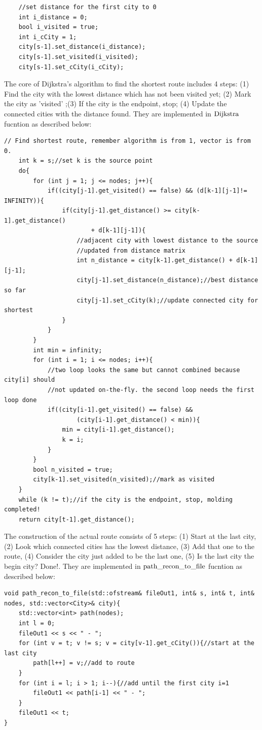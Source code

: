 \documentclass[a4paper,12pt]{article}%
\begin{document}
\begin{lstlisting}
    //set distance for the first city to 0
    int i_distance = 0;
    bool i_visited = true;
    int i_cCity = 1;
    city[s-1].set_distance(i_distance);
    city[s-1].set_visited(i_visited);
    city[s-1].set_cCity(i_cCity);
\end{lstlisting}
The core of Dijkstra's algorithm to find the shortest route includes 4 steps: (1) Find the city with the lowest distance which has not been visited yet; (2) Mark the city as 'visited' ;(3) If the city is the endpoint, stop; (4) Update the connected cities with the distance found. They are implemented in  $\lstinline{Dijkstra}$ fucntion as described below:\newpage
\begin{lstlisting}[title = $\lstinline{Dijkstra}$]
// Find shortest route, remember algorithm is from 1, vector is from 0.
    int k = s;//set k is the source point
    do{
        for (int j = 1; j <= nodes; j++){
            if((city[j-1].get_visited() == false) && (d[k-1][j-1]!= INFINITY)){
                if(city[j-1].get_distance() >= city[k-1].get_distance() 
                        + d[k-1][j-1]){
                    //adjacent city with lowest distance to the source
                    //updated from distance matrix
                    int n_distance = city[k-1].get_distance() + d[k-1][j-1];
                    city[j-1].set_distance(n_distance);//best distance so far
                    city[j-1].set_cCity(k);//update connected city for shortest
                }        
            }           
        }
        int min = infinity;
        for (int i = 1; i <= nodes; i++){           
            //two loop looks the same but cannot combined because city[i] should
            //not updated on-the-fly. the second loop needs the first loop done
            if((city[i-1].get_visited() == false) && 
                    (city[i-1].get_distance() < min)){
                min = city[i-1].get_distance();
                k = i;
            }
        }
        bool n_visited = true;
        city[k-1].set_visited(n_visited);//mark as visited
    }
    while (k != t);//if the city is the endpoint, stop, molding completed! 
    return city[t-1].get_distance();    
\end{lstlisting}
The construction of the actual route consists of 5 steps: (1) Start at the last city, (2) Look which connected cities has the lowest distance, (3) Add that one to the route, (4) Consider the city just added to be the last one, (5) Is the last city the begin city? Done!. They are implemented in  $\lstinline{path_recon_to_file}$ fucntion as described below:
\begin{lstlisting}[title = $\lstinline{path_recon_to_file}$]
void path_recon_to_file(std::ofstream& fileOut1, int& s, int& t, int& nodes, std::vector<City>& city){
    std::vector<int> path(nodes); 
    int l = 0;
    fileOut1 << s << " - ";
    for (int v = t; v != s; v = city[v-1].get_cCity()){//start at the last city
        path[l++] = v;//add to route
    }
    for (int i = l; i > 1; i--){//add until the first city i=1
        fileOut1 << path[i-1] << " - ";
    }       
    fileOut1 << t;
}
\end{lstlisting}
\end{document}
